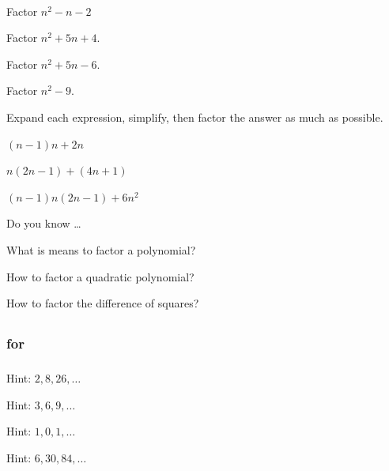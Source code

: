 \begin{exer}[\exerP] %
\label{exer_factor_quad_poly}
~
    \begin{exerpart}
        \item Factor $n^2-n-2$
        \item Factor $n^2+5n+4$.
        \item Factor $n^2+5n-6$.
        \item Factor $n^2-9$.
    \end{exerpart}
\end{exer}

\begin{exer}[\exerU] %
\label{exer_simplify_factor}
    Expand each expression, simplify, then factor the answer as much as possible.
        \begin{exerpart}
            \item $(n-1)n + 2n$
            \item $n(2n-1)+(4n+1)$
            \item $(n-1)n(2n-1) + 6n^2$
        \end{exerpart}
\end{exer}

\begin{exer}[\exerR] %
\label{exer_dyk_factor_polys}
    Do you know \ldots
        \begin{exerpart}
            \item What is means to factor a polynomial?
            \item How to factor a quadratic polynomial?
            \item How to factor the difference of squares? 
        \end{exerpart}
\end{exer}
\subsection{\answers}

\subsubsection{\answers for  \subsumconj}

\subsubsection*{ \answers}
\begin{apart}
    \item Hint: $2, 8, 26, \ldots$
    \item Hint: $3, 6, 9, \ldots$
    \item Hint: $1, 0, 1, \ldots$
    \item Hint: $6, 30, 84, \ldots$
\end{apart}


